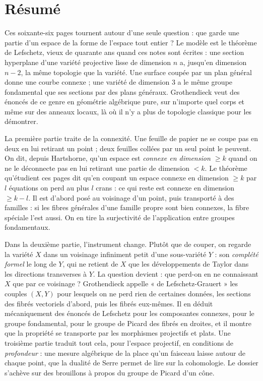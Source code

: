 \documentclass[11pt,a4paper]{article}
\begin{document}
\section*{Résumé}

\begin{resume}
Ces soixante-six pages tournent autour d'une seule question : que garde une
partie d'un espace de la forme de l'espace tout entier ? Le modèle est le
théorème de Lefschetz, vieux de quarante ans quand ces notes sont écrites :
une section hyperplane d'une variété projective lisse de dimension $n$ a,
jusqu'en dimension $n-2$, la même topologie que la variété. Une surface
coupée par un plan général donne une courbe connexe ; une variété de
dimension $3$ a le même groupe fondamental que ses sections par des plans
généraux. Grothendieck veut des énoncés de ce genre en géométrie algébrique
pure, sur n'importe quel corps et même sur des anneaux locaux, là où il n'y a
plus de topologie classique pour les démontrer.

La première partie traite de la connexité. Une feuille de papier ne se coupe
pas en deux en lui retirant un point ; deux feuilles collées par un seul point
le peuvent. On dit, depuis Hartshorne, qu'un espace est \emph{connexe en
dimension $\geq k$} quand on ne le déconnecte pas en lui retirant une partie de
dimension $< k$. Le théorème qu'étudient ces pages dit qu'en coupant un espace connexe
en dimension $\geq k$ par $l$ équations on perd au plus $l$ crans : ce qui
reste est connexe en dimension $\geq k-l$. Il est d'abord posé au voisinage
d'un point, puis transporté à des familles : si les fibres générales d'une
famille propre sont bien connexes, la fibre spéciale l'est aussi. On en tire
la surjectivité de l'application entre groupes fondamentaux.

Dans la deuxième partie, l'instrument change. Plutôt que de couper, on regarde la
variété $X$ dans un voisinage infiniment petit d'une sous-variété $Y$ : son
\emph{complété formel} le long de $Y$, qui ne retient de $X$ que les
développements de Taylor dans les directions transverses à $Y$. La question devient : que perd-on en ne connaissant $X$ que par ce
voisinage ? Grothendieck appelle « de Lefschetz-Grauert » les couples
$(X, Y)$ pour lesquels on ne perd rien de certaines données, les sections
des fibrés vectoriels d'abord, puis les fibrés eux-mêmes. Il en déduit
mécaniquement des énoncés de Lefschetz pour les composantes connexes, pour le
groupe fondamental, pour le groupe de Picard des fibrés en droites, et il
montre que la propriété se transporte par les morphismes projectifs et plats.
Une troisième partie traduit tout cela, pour l'espace projectif, en conditions
de \emph{profondeur} : une mesure algébrique de la place qu'un faisceau
laisse autour de chaque point, que la dualité de Serre permet de lire sur la
cohomologie. Le dossier s'achève sur des brouillons à propos du groupe de
Picard d'un cône.


\end{resume}
\end{document}
